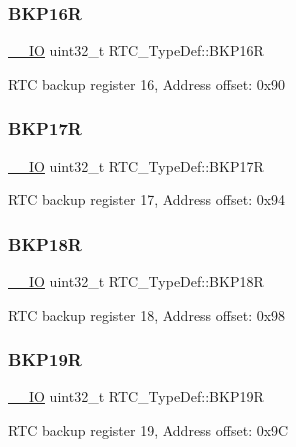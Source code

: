 \subsubsection{\texorpdfstring{BKP16R}{BKP16R}}
{\footnotesize\ttfamily \mbox{\hyperlink{core__sc300_8h_aec43007d9998a0a0e01faede4133d6be}{\+\_\+\+\_\+\+IO}} uint32\+\_\+t R\+T\+C\+\_\+\+Type\+Def\+::\+B\+K\+P16R}

R\+TC backup register 16, Address offset\+: 0x90 \mbox{\label{struct_r_t_c___type_def_a90a305a8e00b357f28daef5041e5a8b1}} 
\subsubsection{\texorpdfstring{BKP17R}{BKP17R}}
{\footnotesize\ttfamily \mbox{\hyperlink{core__sc300_8h_aec43007d9998a0a0e01faede4133d6be}{\+\_\+\+\_\+\+IO}} uint32\+\_\+t R\+T\+C\+\_\+\+Type\+Def\+::\+B\+K\+P17R}

R\+TC backup register 17, Address offset\+: 0x94 \mbox{\label{struct_r_t_c___type_def_a171288f82cab2623832de779fb435d74}} 
\subsubsection{\texorpdfstring{BKP18R}{BKP18R}}
{\footnotesize\ttfamily \mbox{\hyperlink{core__sc300_8h_aec43007d9998a0a0e01faede4133d6be}{\+\_\+\+\_\+\+IO}} uint32\+\_\+t R\+T\+C\+\_\+\+Type\+Def\+::\+B\+K\+P18R}

R\+TC backup register 18, Address offset\+: 0x98 \mbox{\label{struct_r_t_c___type_def_a993f54e8feff9254f795dfd3e000fc55}} 
\subsubsection{\texorpdfstring{BKP19R}{BKP19R}}
{\footnotesize\ttfamily \mbox{\hyperlink{core__sc300_8h_aec43007d9998a0a0e01faede4133d6be}{\+\_\+\+\_\+\+IO}} uint32\+\_\+t R\+T\+C\+\_\+\+Type\+Def\+::\+B\+K\+P19R}

R\+TC backup register 19, Address offset\+: 0x9C \mbox{\label{struct_r_t_c___type_def_a5439bfca3708c6b8be6a74626f06111f}} 
